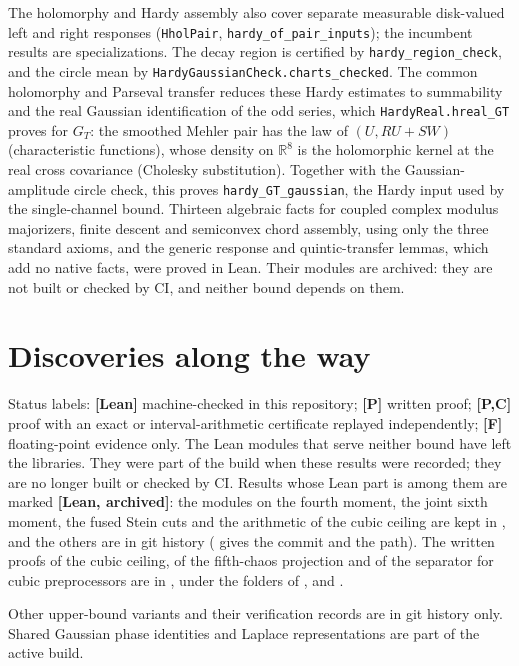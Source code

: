 \documentclass[11pt,a4paper]{article}
\newcommand{\lean}[1]{\texttt{\small #1}}
\begin{document}
The holomorphy and Hardy assembly also cover separate measurable disk-valued left and right responses
(\lean{HholPair}, \lean{hardy\_of\_pair\_inputs}); the incumbent results are specializations.
The decay region is certified by \lean{hardy\_region\_check}, and the circle mean by
\lean{HardyGaussianCheck.charts\_checked}.
The common holomorphy and Parseval transfer reduces these Hardy estimates to summability and the real
Gaussian identification of the odd series, which \lean{HardyReal.hreal\_GT} proves for $G_T$:
the smoothed Mehler pair has the law of $(U, RU+SW)$ (characteristic functions), whose density on $\mathbb R^8$ is the
holomorphic kernel at the real cross covariance (Cholesky substitution). Together with the Gaussian-amplitude
circle check, this proves \lean{hardy\_GT\_gaussian}, the Hardy input used by the single-channel bound.
Thirteen algebraic facts for coupled complex modulus majorizers, finite descent and semiconvex chord
assembly, using only the three standard axioms, and the generic response and quintic-transfer lemmas, which add no
native facts, were proved in Lean. Their modules are archived: they are not built
or checked by CI, and neither bound depends on them.

\section{Discoveries along the way}\label{sec:discoveries}
Status labels: \textbf{[Lean]} machine-checked in this repository; \textbf{[P]} written proof; \textbf{[P,C]} proof with an
exact or interval-arithmetic certificate replayed independently; \textbf{[F]} floating-point evidence only.
The Lean modules that serve neither bound have left the libraries. They were part of the
build when these results were recorded; they are no longer built or checked by CI. Results whose Lean part is among them
are marked \textbf{[Lean, archived]}: the modules on the fourth moment, the joint sixth moment, the fused Stein cuts and
the arithmetic of the cubic ceiling are kept in , and the others are in git history
( gives the commit and the path). The written proofs of the cubic ceiling, of the
fifth-chaos projection and of the separator for cubic preprocessors are in , under the
 folders of ,  and .

Other upper-bound variants and their verification records are in git history only. Shared Gaussian phase identities
and Laplace representations are part of the active build.
\end{document}
